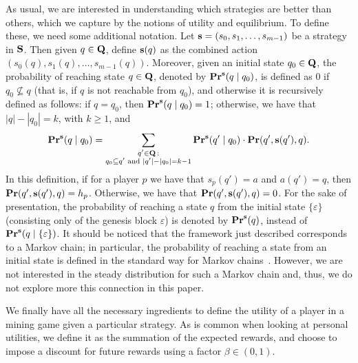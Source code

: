 As usual, we are interested in understanding which strategies are better than others, which we capture by the notions of  utility and equilibrium. To define these, we need some additional notation.
Let $\mathbf{s} = (s_0, s_1, \ldots, s_{m-1})$ be a strategy in $\mathbf{S}$. Then given $q \in \mathbf{Q}$, define $\mathbf{s}(q)$ as the combined action $(s_0(q), s_1(q), \ldots, s_{m-1}(q))$. Moreover, given an initial state $q_0 \in \mathbf{Q}$,
the probability of reaching state $q \in \mathbf{Q}$, denoted by $\mathbf{Pr}^{\mathbf{s}}(q \mid q_0)$, is defined as 0 if $q_0 \not\subseteq q$ (that is, if $q$ is not reachable from $q_0$), and otherwise it is recursively defined as follows: if $q =  q_0$, then $\mathbf{Pr}^{\mathbf{s}}(q \mid q_0) = 1$; otherwise, we have that $|q| - |q_0| = k$, with $k \geq 1$, and
$$
\mathbf{Pr}^{\mathbf{s}}(q \mid q_0) =
\sum_{\substack{q' \in \mathbf{Q} \,:\\ q_0 \subseteq q' \text{ and } |q'| - |q_0| = k-1}}
 \mathbf{Pr}^{\mathbf{s}}(q' \mid q_0) \cdot \mathbf{Pr}(q', \mathbf{s}(q'), q).
 $$
In this definition, if for a player $p$ we have that $s_p(q') = a$ and $a(q') = q$, then $\mathbf{Pr}(q', \mathbf{s}(q'), q) = h_p$. Otherwise, we have that $\mathbf{Pr}(q', \mathbf{s}(q'), q) = 0$.
For the sake of presentation, the probability of reaching a state $q$ from the initial state $\{\varepsilon\}$ (consisting only of the genesis block $\varepsilon$) is denoted by $\mathbf{Pr}^{\mathbf{s}}(q)$, instead of $\mathbf{Pr}^{\mathbf{s}}(q \mid \{\varepsilon\})$. 
It should be noticed that the framework just described corresponds to a Markov chain; in particular, the probability of reaching a state from an initial state is defined in the standard way for Markov chains~\cite{MU05}. However, we are not interested in the steady distribution for such a Markov chain and, thus, we do not explore more this connection in this paper.

We finally have all the necessary ingredients to define the utility of a player in a mining game given a particular strategy. As is common
when looking at personal utilities, we define it as the summation of the expected rewards, and choose
to impose a discount for future rewards using a factor $\beta \in (0,1)$.

